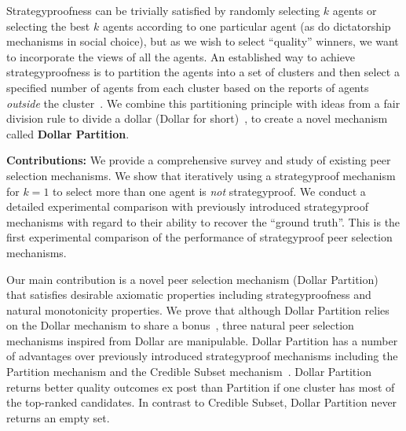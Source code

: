 \documentclass[letterpaper]{article}
\newcommand{\citep}{\cite}
\begin{document}


Strategyproofness can be trivially satisfied by randomly selecting $k$ agents or selecting the best $k$ agents according to one particular agent (as do dictatorship mechanisms in social choice), but as we wish to select ``quality'' winners, we want to incorporate the views of all the agents. 
An established way to achieve strategyproofness is to partition the agents into a set of clusters and then select a specified number of agents from each cluster based on the reports of agents \emph{outside} the cluster~\citep{AFPT11a}. We combine this partitioning principle with ideas from a fair division rule to divide a dollar (Dollar for short)~\citep{CMT08a}, to create a novel mechanism called \textbf{Dollar Partition}.

\smallskip
\textbf{Contributions:}\;
We provide a comprehensive survey and study of existing peer selection mechanisms.
We show that iteratively using a strategyproof mechanism for $k=1$ to select more than one agent is \emph{not} strategyproof. We conduct a detailed experimental comparison with previously introduced strategyproof mechanisms with regard to their ability to recover the ``ground truth''. This is the first experimental comparison of the performance of strategyproof peer selection mechanisms.

Our main contribution is a novel peer selection mechanism (Dollar Partition) that satisfies desirable axiomatic properties including strategyproofness and natural monotonicity properties. We prove that although Dollar Partition relies on the Dollar mechanism to share a bonus~\citep{CMT08a}, three natural peer selection mechanisms inspired from Dollar are manipulable. Dollar Partition has a number of advantages over previously introduced strategyproof mechanisms including the Partition mechanism and the Credible Subset mechanism~\citep{KLMP15b}. Dollar Partition returns better quality outcomes ex post than Partition if one cluster has most of the top-ranked candidates. In contrast to Credible Subset, Dollar Partition never returns an empty set.
\end{document}
